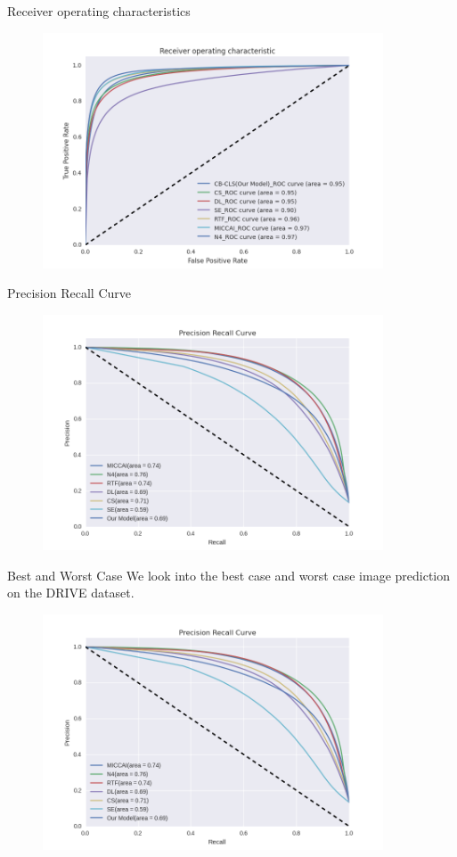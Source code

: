 \documentclass{beamer}
\begin{document}
	\begin{frame}{Receiver operating characteristics}
		\begin{figure}
			\includegraphics[width=0.9\textwidth]{framework/compareall}			
		\end{figure}
	\end{frame}
	
	\begin{frame}{Precision Recall Curve}
		\begin{figure}
			\includegraphics[width=0.9\textwidth]{framework/prcall}			
		\end{figure}
	\end{frame}
	
	\begin{frame}{Best and Worst Case}
		We look into the best case and worst case image prediction on the DRIVE dataset.
		\begin{figure}
			\includegraphics[width=0.9\textwidth]{framework/prcall}			
		\end{figure}
	\end{frame}
\end{document}
